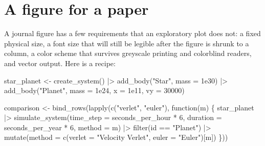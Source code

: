 \documentclass[
  10.5pt,
  letterpaper,
]{scrbook}
\newenvironment{Shaded}{\begin{snugshade}}{\end{snugshade}}
\newcommand{\AttributeTok}[1]{\textcolor[rgb]{0.00,0.00,0.00}{#1}}
\newcommand{\ControlFlowTok}[1]{\textcolor[rgb]{0.00,0.00,0.00}{#1}}
\newcommand{\DecValTok}[1]{\textcolor[rgb]{0.00,0.00,0.00}{#1}}
\newcommand{\FloatTok}[1]{\textcolor[rgb]{0.00,0.00,0.00}{#1}}
\newcommand{\FunctionTok}[1]{\textcolor[rgb]{0.00,0.00,0.00}{#1}}
\newcommand{\NormalTok}[1]{\textcolor[rgb]{0.00,0.00,0.00}{#1}}
\newcommand{\OtherTok}[1]{\textcolor[rgb]{0.00,0.00,0.00}{#1}}
\newcommand{\SpecialCharTok}[1]{\textcolor[rgb]{0.00,0.00,0.00}{#1}}
\newcommand{\StringTok}[1]{\textcolor[rgb]{0.00,0.00,0.00}{#1}}
\theoremstyle{definition}
\theoremstyle{plain}
\theoremstyle{remark}
\begin{document}
\section{A figure for a paper}\label{a-figure-for-a-paper}

A journal figure has a few requirements that an exploratory plot does
not: a fixed physical size, a font size that will still be legible after
the figure is shrunk to a column, a color scheme that survives greyscale
printing and colorblind readers, and vector output. Here is a recipe:

\begin{Shaded}
\begin{Highlighting}[]
\NormalTok{star\_planet }\OtherTok{\textless{}{-}} \FunctionTok{create\_system}\NormalTok{() }\SpecialCharTok{|\textgreater{}}
  \FunctionTok{add\_body}\NormalTok{(}\StringTok{"Star"}\NormalTok{,   }\AttributeTok{mass =} \FloatTok{1e30}\NormalTok{) }\SpecialCharTok{|\textgreater{}}
  \FunctionTok{add\_body}\NormalTok{(}\StringTok{"Planet"}\NormalTok{, }\AttributeTok{mass =} \FloatTok{1e24}\NormalTok{, }\AttributeTok{x =} \FloatTok{1e11}\NormalTok{, }\AttributeTok{vy =} \DecValTok{30000}\NormalTok{)}

\NormalTok{comparison }\OtherTok{\textless{}{-}} \FunctionTok{bind\_rows}\NormalTok{(}\FunctionTok{lapply}\NormalTok{(}\FunctionTok{c}\NormalTok{(}\StringTok{"verlet"}\NormalTok{, }\StringTok{"euler"}\NormalTok{), }\ControlFlowTok{function}\NormalTok{(m) \{}
\NormalTok{  star\_planet }\SpecialCharTok{|\textgreater{}}
    \FunctionTok{simulate\_system}\NormalTok{(}\AttributeTok{time\_step =}\NormalTok{ seconds\_per\_hour }\SpecialCharTok{*} \DecValTok{6}\NormalTok{,}
                    \AttributeTok{duration =}\NormalTok{ seconds\_per\_year }\SpecialCharTok{*} \DecValTok{6}\NormalTok{, }\AttributeTok{method =}\NormalTok{ m) }\SpecialCharTok{|\textgreater{}}
    \FunctionTok{filter}\NormalTok{(id }\SpecialCharTok{==} \StringTok{"Planet"}\NormalTok{) }\SpecialCharTok{|\textgreater{}}
    \FunctionTok{mutate}\NormalTok{(}\AttributeTok{method =} \FunctionTok{c}\NormalTok{(}\AttributeTok{verlet =} \StringTok{"Velocity Verlet"}\NormalTok{, }\AttributeTok{euler =} \StringTok{"Euler"}\NormalTok{)[m])}
\NormalTok{\}))}


\end{Highlighting}
\end{Shaded}
\end{document}
